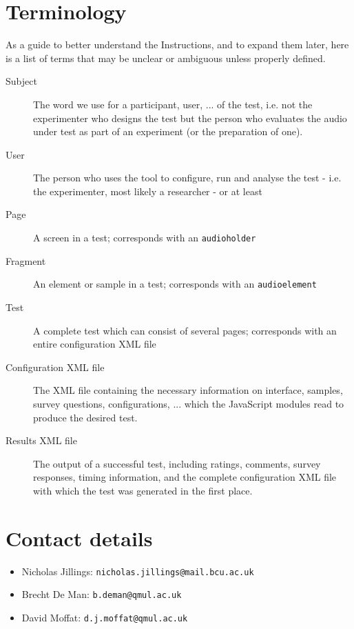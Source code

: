 \documentclass[11pt, oneside]{article}   	%
\begin{document}
\section{Terminology} %
	As a guide to better understand the Instructions, and to expand them later, here is a list of terms that may be unclear or ambiguous unless properly defined. 
	\begin{description}
		\item[Subject] The word we use for a participant, user, ... of the test, i.e. not the experimenter who designs the test but the person who evaluates the audio under test as part of an experiment (or the preparation of one). 
		\item[User] The person who uses the tool to configure, run and analyse the test - i.e. the experimenter, most likely a researcher - or at least 
		\item[Page] A screen in a test; corresponds with an \texttt{audioholder}
		\item[Fragment] An element or sample in a test; corresponds with an \texttt{audioelement}
		\item[Test] A complete test which can consist of several pages; corresponds with an entire configuration XML file
		\item[Configuration XML file] The XML file containing the necessary information on interface, samples, survey questions, configurations, ... which the JavaScript modules read to produce the desired test.
		\item[Results XML file] The output of a successful test, including ratings, comments, survey responses, timing information, and the complete configuration XML file with which the test was generated in the first place. 
	\end{description}

\clearpage

\setcounter{secnumdepth}{0} %
\section{Contact details} %
\label{sec:contact}

	\begin{itemize}
		\item Nicholas Jillings: \texttt{nicholas.jillings@mail.bcu.ac.uk}
		\item Brecht De Man: \texttt{b.deman@qmul.ac.uk}
		\item David Moffat: \texttt{d.j.moffat@qmul.ac.uk}
	\end{itemize}
\end{document}
